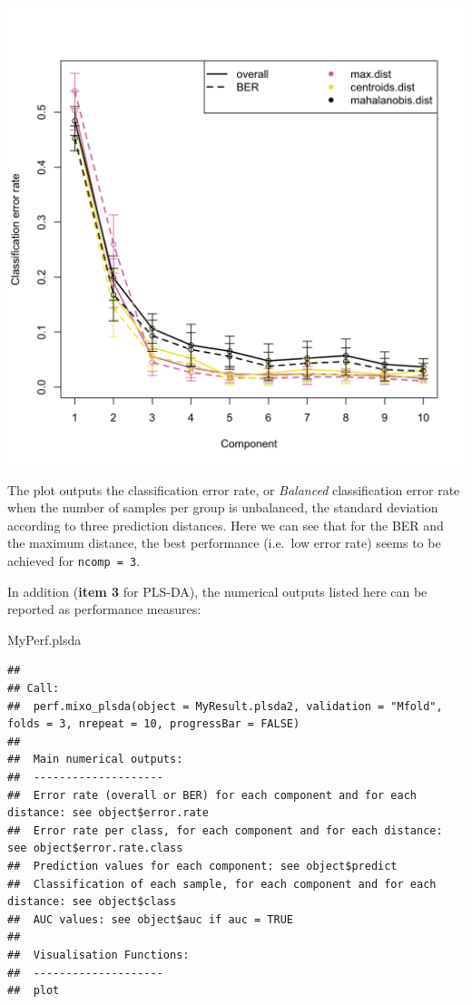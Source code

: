 \documentclass[]{book}
\newenvironment{Shaded}{\begin{snugshade}}{\end{snugshade}}
\newcommand{\NormalTok}[1]{#1}
\begin{document}
\begin{center}\includegraphics[width=0.75\linewidth,]{Figures/04-plsda-perf-1-1} \end{center}

The plot outputs the classification error rate, or \emph{Balanced} classification error rate when the number of samples per group is unbalanced, the standard deviation according to three prediction distances. Here we can see that for the BER and the maximum distance, the best performance (i.e.~low error rate) seems to be achieved for \texttt{ncomp\ =\ 3}.

In addition (\textbf{item 3} for PLS-DA), the numerical outputs listed here can be reported as performance measures:

\begin{Shaded}
\begin{Highlighting}[]
\NormalTok{MyPerf.plsda}
\end{Highlighting}
\end{Shaded}

\begin{verbatim}
## 
## Call:
##  perf.mixo_plsda(object = MyResult.plsda2, validation = "Mfold", folds = 3, nrepeat = 10, progressBar = FALSE) 
## 
##  Main numerical outputs: 
##  -------------------- 
##  Error rate (overall or BER) for each component and for each distance: see object$error.rate 
##  Error rate per class, for each component and for each distance: see object$error.rate.class 
##  Prediction values for each component: see object$predict 
##  Classification of each sample, for each component and for each distance: see object$class 
##  AUC values: see object$auc if auc = TRUE 
## 
##  Visualisation Functions: 
##  -------------------- 
##  plot
\end{verbatim}
\end{document}

